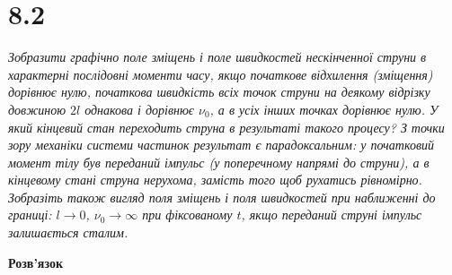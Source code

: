 


%


\section[Задача №8.2]{8.2}

\textit{Зобразити графічно поле зміщень і поле швидкостей нескінченної струни в характерні послідовні моменти часу, якщо початкове відхилення (зміщення) дорівнює нулю, початкова швидкість всіх точок струни на деякому відрізку довжиною $2l$ однакова і дорівнює $\nu_0$, а в усіх інших точках дорівнює нулю. У який кінцевий стан переходить струна в результаті такого процесу? З точки зору механіки системи частинок результат є парадоксальним: у початковий момент тілу був переданий імпульс (у поперечному напрямі до струни), а в кінцевому стані струна нерухома, замість того щоб рухатись рівномірно. Зобразіть також вигляд поля зміщень і поля швидкостей при наближенні до границі: $l \to 0$, $\nu_0 \to \infty$ при фіксованому $t$, якщо переданий струні імпульс залишається сталим.}

\begin{center}
    \large{\textbf{Розв'язок}}
\end{center}

